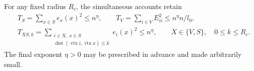 \begin{lemma}\label{lem:early-low-squares}
For any fixed radius \(R_c\), the simultaneous accounts retain
\begin{equation}
\begin{split}
 &T_S=\sum_{x\in S}e_x(x)^2\le n^\eta,
 \qquad T_V=\sum_{i\in V}E_{ii}^2\le n^\eta n/l_0,\\
 &T_{XS,k}=\sum_{\substack{i\in X,\ x\in S\\
    \operatorname{dist}(\operatorname{vtx}i,\operatorname{vtx}x)\le k}}
           e_i(x)^2\le n^\eta,
 \qquad X\in\{V,S\},\quad 0\le k\le R_c .
\end{split}
\label{eq:original-23}
\end{equation}
The final exponent \(\eta>0\) may be prescribed in advance and
made arbitrarily small.
\end{lemma}
